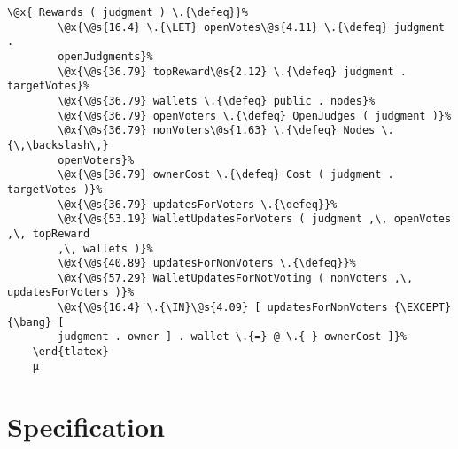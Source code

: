 \begin{lstlisting}[caption=Operator updating wallets for judgment, label=lst:ModelRewardChaincode]
        \@x{ Rewards ( judgment ) \.{\defeq}}%
        \@x{\@s{16.4} \.{\LET} openVotes\@s{4.11} \.{\defeq} judgment .
        openJudgments}%
        \@x{\@s{36.79} topReward\@s{2.12} \.{\defeq} judgment . targetVotes}%
        \@x{\@s{36.79} wallets \.{\defeq} public . nodes}%
        \@x{\@s{36.79} openVoters \.{\defeq} OpenJudges ( judgment )}%
        \@x{\@s{36.79} nonVoters\@s{1.63} \.{\defeq} Nodes \.{\,\backslash\,}
        openVoters}%
        \@x{\@s{36.79} ownerCost \.{\defeq} Cost ( judgment . targetVotes )}%
        \@x{\@s{36.79} updatesForVoters \.{\defeq}}%
        \@x{\@s{53.19} WalletUpdatesForVoters ( judgment ,\, openVotes ,\, topReward
        ,\, wallets )}%
        \@x{\@s{40.89} updatesForNonVoters \.{\defeq}}%
        \@x{\@s{57.29} WalletUpdatesForNotVoting ( nonVoters ,\, updatesForVoters )}%
        \@x{\@s{16.4} \.{\IN}\@s{4.09} [ updatesForNonVoters {\EXCEPT} {\bang} [
        judgment . owner ] . wallet \.{=} @ \.{-} ownerCost ]}%
    \end{tlatex}
    µ
\end{lstlisting}

\section{Specification}
\label{subsec:ModelSpec}

